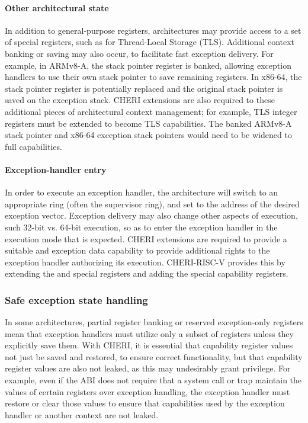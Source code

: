 \paragraph{Other architectural state}
In addition to general-purpose registers, architectures may provide access to
a set of special registers, such as for Thread-Local Storage (TLS).
Additional context banking or saving may also occur, to facilitate fast
exception delivery.
For example, in ARMv8-A, the stack pointer register is banked, allowing
exception handlers to use their own stack pointer to save remaining registers.
In x86-64, the stack pointer register is potentially replaced and the original
stack pointer is saved on the exception stack.
CHERI extensions are also required to these additional pieces of
architectural context management; for example, TLS integer registers must be
extended to become TLS capabilities.
The banked ARMv8-A stack pointer and x86-64 exception stack pointers
would need to be widened to full capabilities.

\paragraph{Exception-handler entry}
In order to execute an exception handler, the architecture will switch to an
appropriate ring (often the supervisor ring), and set \PC{} to the address of
the desired exception vector.
Exception delivery may also change other aspects of execution, such 32-bit
vs. 64-bit execution, so as to enter the exception handler in the execution
mode that is expected.
CHERI extensions are required to provide a suitable \PCC{} and
exception data capability to provide additional rights to the
exception handler authorizing its execution.
CHERI-RISC-V provides this by extending the \xtvec{} and \xscratch{} special registers
and adding the \xtdc{} special capability registers.

\subsubsection{Safe exception state handling}

In some architectures, partial register banking or reserved exception-only
registers mean that exception handlers must utilize only a subset of
registers unless they explicitly save them.
With CHERI, it is essential that capability register values not just be saved
and restored, to ensure correct functionality, but that capability register
values are also not leaked, as this may undesirably grant privilege.
For example, even if the ABI does not require that a system call or trap
maintain the values of certain registers over exception handling, the
exception handler must restore or clear those values to ensure that
capabilities used by the exception handler or another context are not leaked.

